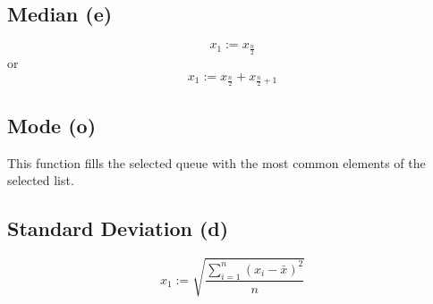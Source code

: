 \documentclass[12pt]{article}
\begin{document}
\subsection*{Median (e)}
\label{sec:org2efaa02}
$$
x_1 := x_{\frac{n}{2}}
$$
or
$$
x_1 := x_{\frac{n}{2}} + x_{\frac{n}{2} + 1}
$$
\subsection*{Mode (o)}
\label{sec:orgb894ea2}
This function fills the selected queue with the most common elements of the selected list.
\subsection*{Standard Deviation (d)}
\label{sec:org981e16c}
$$
x_1 := \sqrt{\frac{\sum_{i=1}^{n}(x_i - \bar x)^2}{n}}
$$
\end{document}

